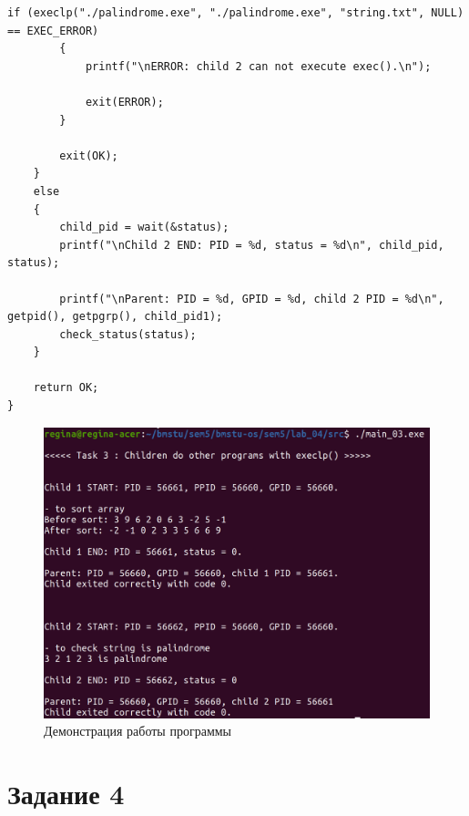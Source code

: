 \begin{center}
\begin{lstlisting}[label=lst:exec,caption=Системный вызов execlp]
        if (execlp("./palindrome.exe", "./palindrome.exe", "string.txt", NULL) == EXEC_ERROR)
        {
            printf("\nERROR: child 2 can not execute exec().\n");

            exit(ERROR);
        }

        exit(OK);
    }
    else
    {
        child_pid = wait(&status);
        printf("\nChild 2 END: PID = %d, status = %d\n", child_pid, status);

        printf("\nParent: PID = %d, GPID = %d, child 2 PID = %d\n", getpid(), getpgrp(), child_pid1);
        check_status(status);
    }

    return OK;
}
\end{lstlisting}
\end{center}

\begin{figure}[H]
	\begin{center}
		\includegraphics[scale=0.3]{inc/exec.png}
	\end{center}
	\captionsetup{justification=centering}
	\caption{Демонстрация работы программы}
	\label{img:exec}
\end{figure}

\section*{Задание 4}

